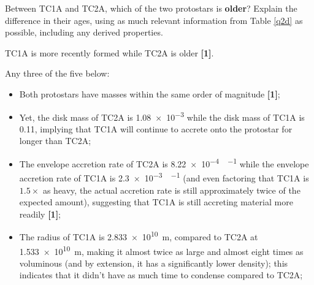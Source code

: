 \documentclass[a4paper,11pt,draft]{exam}
\begin{document}
\begin{questions}
	
\question[4]
	Between TC1A and TC2A, which of the two protostars is \textbf{older}? Explain the difference in their ages, using as much relevant information from Table \ref{q2d} as possible, including any derived properties.
	\droppoints
	\begin{solution}
		TC1A is more recently formed while TC2A is older \textbf{[1]}.
		
		Any three of the five below:
		\begin{itemize}[leftmargin=10pt]
			\item Both protostars have masses within the same order of magnitude \textbf{[1]};
			
			\item Yet, the disk mass of TC2A is \SI{1.08e-3}{\solarmass} while the disk mass of TC1A is \SI{0.11}{\solarmass}, implying that TC1A will continue to accrete onto the protostar for longer than TC2A;
			
			\item The envelope accretion rate of TC2A is \SI{8.22e-4}{\solarmass\per\year} while the envelope accretion rate of TC1A is \SI{2.3e-3}{\solarmass\per\year} (and even factoring that TC1A is $ 1.5\times $ as heavy, the actual accretion rate is still approximately twice of the expected amount), suggesting that TC1A is still accreting material more readily \textbf{[1]};
			
			\item The radius of TC1A is \SI{2.833e10}{\metre}, compared to TC2A at \SI{1.533e10}{\metre}, making it almost twice as large and almost eight times as voluminous (and by extension, it has a significantly lower density); this indicates that it didn’t have as much time to condense compared to TC2A;
			

\end{itemize}
\end{solution}
\end{questions}
\end{document}
